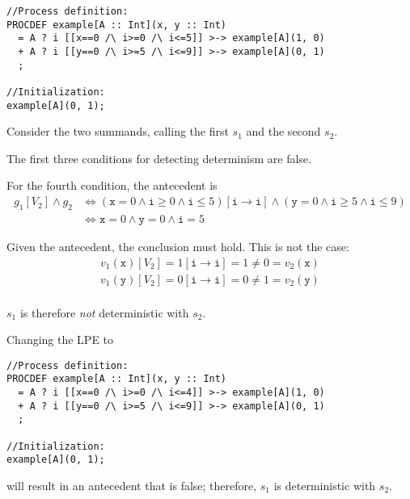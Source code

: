 \begin{lstlisting}
//Process definition:
PROCDEF example[A :: Int](x, y :: Int)
  = A ? i [[x==0 /\ i>=0 /\ i<=5]] >-> example[A](1, 0)
  + A ? i [[y==0 /\ i>=5 /\ i<=9]] >-> example[A](0, 1)
  ;

//Initialization:
example[A](0, 1);
\end{lstlisting}

Consider the two summands, calling the first $s_1$ and the second $s_2$.

The first three conditions for detecting determinism are false.

For the fourth condition, the antecedent is
\begin{align*}
g_1[V_2] \land g_2 &\Leftrightarrow (\texttt{x} = 0 \land \texttt{i} \geq 0 \land \texttt{i} \leq 5)[\texttt{i} \rightarrow \texttt{i}] \land (\texttt{y} = 0 \land \texttt{i} \geq 5 \land \texttt{i} \leq 9) \\
&\Leftrightarrow \texttt{x} = 0 \land \texttt{y} = 0 \land \texttt{i} = 5
\end{align*}

Given the antecedent, the conclusion must hold.
This is not the case:
\begin{align*}
v_1(\texttt{x})[V_2] = 1[\texttt{i} \rightarrow \texttt{i}] = 1 \neq 0 = v_2(\texttt{x}) \\
v_1(\texttt{y})[V_2] = 0[\texttt{i} \rightarrow \texttt{i}] = 0 \neq 1 = v_2(\texttt{y}) \\
\end{align*}

$s_1$ is therefore \emph{not} deterministic with $s_2$.

Changing the LPE to

\begin{lstlisting}
//Process definition:
PROCDEF example[A :: Int](x, y :: Int)
  = A ? i [[x==0 /\ i>=0 /\ i<=4]] >-> example[A](1, 0)
  + A ? i [[y==0 /\ i>=5 /\ i<=9]] >-> example[A](0, 1)
  ;

//Initialization:
example[A](0, 1);
\end{lstlisting}

will result in an antecedent that is false; therefore, $s_1$ is deterministic with $s_2$.

